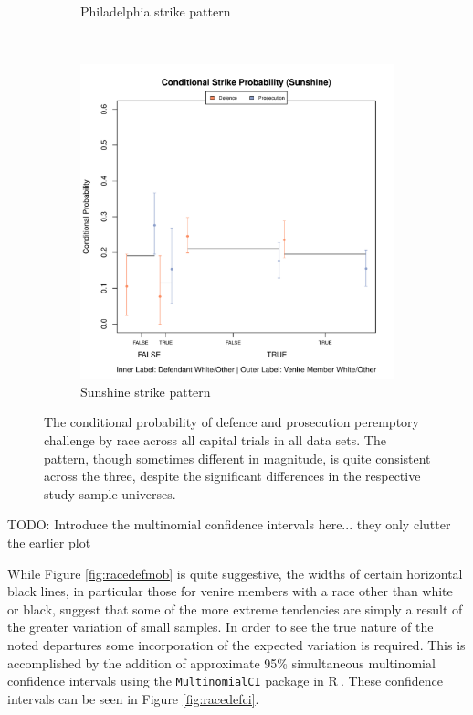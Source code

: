 \documentclass[12pt]{article}
\newcommand*{\R}{\textsf{R}$~$}
\newcommand{\TODO}[1]{{\color{brickred} TODO:  {#1}}}
\begin{document}
\begin{figure}[h!]
\begin{subfigure}{0.32\textwidth}
    \caption{\footnotesize Philadelphia strike pattern}
    \label{fig:philcomp}
  \end{subfigure}
  ~
  \begin{subfigure}{0.32\textwidth}
    \includegraphics[scale=0.32]{SunshineCompPlot}
    \caption{\footnotesize Sunshine strike pattern}
    \label{fig:suncomp}
  \end{subfigure}
  \caption[Strikes by Racial Combination (All Capital Trial Data)]
  {\footnotesize The conditional probability of defence and prosecution peremptory challenge by race across all
    capital trials in all data sets. The pattern, though sometimes different in magnitude, is quite consistent across the three,
    despite the significant differences in the respective study sample universes.}
  \label{fig:racedefalldata}
\end{figure}

\TODO{Introduce the multinomial confidence intervals here... they only clutter the earlier plot}
 
While Figure \ref{fig:racedefmob} is quite suggestive, the widths of certain horizontal black lines, in particular those for venire members with a race other than white or black, suggest that some of the more extreme tendencies are simply a result of the greater variation of small samples. In order to see the true nature of the noted departures some incorporation of the expected variation is required. This is accomplished by the addition of approximate 95\% simultaneous multinomial confidence intervals using the \texttt{MultinomialCI} package in \R. These confidence intervals can be seen in Figure \ref{fig:racedefci}.
\end{document}
